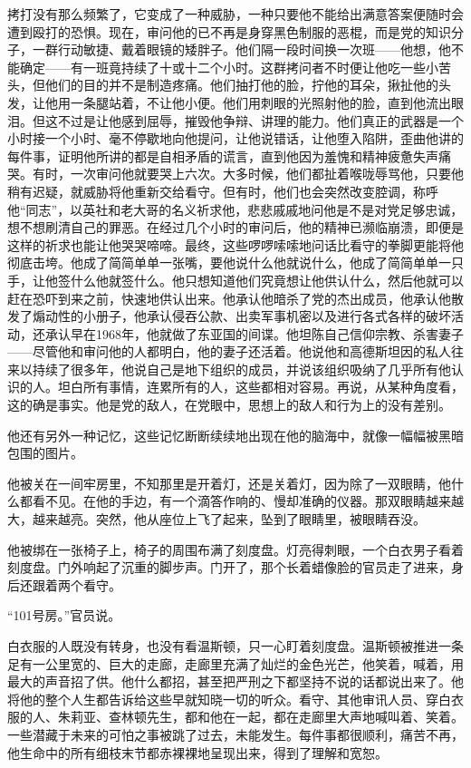 拷打没有那么频繁了，它变成了一种威胁，一种只要他不能给出满意答案便随时会遭到殴打的恐惧。现在，审问他的已不再是身穿黑色制服的恶棍，而是党的知识分子，一群行动敏捷、戴着眼镜的矮胖子。他们隔一段时间换一次班------他想，他不能确定------有一班竟持续了十或十二个小时。这群拷问者不时便让他吃一些小苦头，但他们的目的并不是制造疼痛。他们抽打他的脸，拧他的耳朵，揪扯他的头发，让他用一条腿站着，不让他小便。他们用刺眼的光照射他的脸，直到他流出眼泪。但这不过是让他感到屈辱，摧毁他争辩、讲理的能力。他们真正的武器是一个小时接一个小时、毫不停歇地向他提问，让他说错话，让他堕入陷阱，歪曲他讲的每件事，证明他所讲的都是自相矛盾的谎言，直到他因为羞愧和精神疲惫失声痛哭。有时，一次审问他就要哭上六次。大多时候，他们都扯着喉咙辱骂他，只要他稍有迟疑，就威胁将他重新交给看守。但有时，他们也会突然改变腔调，称呼他``同志''，以英社和老大哥的名义祈求他，悲悲戚戚地问他是不是对党足够忠诚，想不想刷清自己的罪恶。在经过几个小时的审问后，他的精神已濒临崩溃，即便是这样的祈求也能让他哭哭啼啼。最终，这些啰啰嗦嗦地问话比看守的拳脚更能将他彻底击垮。他成了简简单单一张嘴，要他说什么他就说什么，他成了简简单单一只手，让他签什么他就签什么。他只想知道他们究竟想让他供认什么，然后他就可以赶在恐吓到来之前，快速地供认出来。他承认他暗杀了党的杰出成员，他承认他散发了煽动性的小册子，他承认侵吞公款、出卖军事机密以及进行各式各样的破坏活动，还承认早在1968年，他就做了东亚国的间谍。他坦陈自己信仰宗教、杀害妻子------尽管他和审问他的人都明白，他的妻子还活着。他说他和高德斯坦因的私人往来以持续了很多年，他说自己是地下组织的成员，并说该组织吸纳了几乎所有他认识的人。坦白所有事情，连累所有的人，这些都相对容易。再说，从某种角度看，这的确是事实。他是党的敌人，在党眼中，思想上的敌人和行为上的没有差别。

他还有另外一种记忆，这些记忆断断续续地出现在他的脑海中，就像一幅幅被黑暗包围的图片。

他被关在一间牢房里，不知那里是开着灯，还是关着灯，因为除了一双眼睛，他什么都看不见。在他的手边，有一个滴答作响的、慢却准确的仪器。那双眼睛越来越大，越来越亮。突然，他从座位上飞了起来，坠到了眼睛里，被眼睛吞没。

他被绑在一张椅子上，椅子的周围布满了刻度盘。灯亮得刺眼，一个白衣男子看着刻度盘。门外响起了沉重的脚步声。门开了，那个长着蜡像脸的官员走了进来，身后还跟着两个看守。

``101号房。''官员说。

白衣服的人既没有转身，也没有看温斯顿，只一心盯着刻度盘。温斯顿被推进一条足有一公里宽的、巨大的走廊，走廊里充满了灿烂的金色光芒，他笑着，喊着，用最大的声音招了供。他什么都招，甚至把严刑之下都坚持不说的话都说出来了。他将他的整个人生都告诉给这些早就知晓一切的听众。看守、其他审讯人员、穿白衣服的人、朱莉亚、查林顿先生，都和他在一起，都在走廊里大声地喊叫着、笑着。一些潜藏于未来的可怕之事被跳了过去，未能发生。每件事都很顺利，痛苦不再，他生命中的所有细枝末节都赤裸裸地呈现出来，得到了理解和宽恕。

